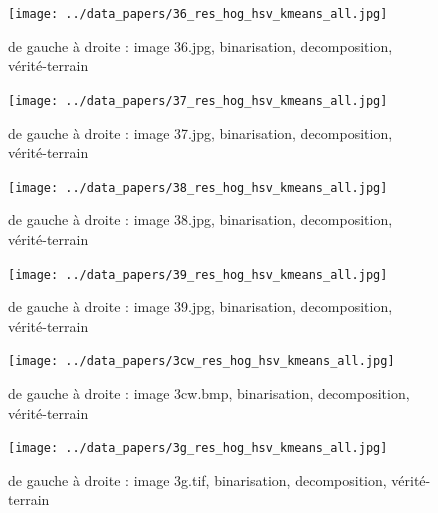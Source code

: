 \documentclass{book}
\begin{document}
\begin{figure}[H]
\begin{center}
\texttt{[image: ../data\_papers/36\_res\_hog\_hsv\_kmeans\_all.jpg]}
\end{center}
\caption{de gauche à droite : image 36.jpg, binarisation, decomposition, vérité-terrain}
\label{36}
\end{figure}
\clearpage


\begin{figure}[H]
\begin{center}
\texttt{[image: ../data\_papers/37\_res\_hog\_hsv\_kmeans\_all.jpg]}
\end{center}
\caption{de gauche à droite : image 37.jpg, binarisation, decomposition, vérité-terrain}
\label{37}
\end{figure}
\clearpage


\begin{figure}[H]
\begin{center}
\texttt{[image: ../data\_papers/38\_res\_hog\_hsv\_kmeans\_all.jpg]}
\end{center}
\caption{de gauche à droite : image 38.jpg, binarisation, decomposition, vérité-terrain}
\label{38}
\end{figure}
\clearpage


\begin{figure}[H]
\begin{center}
\texttt{[image: ../data\_papers/39\_res\_hog\_hsv\_kmeans\_all.jpg]}
\end{center}
\caption{de gauche à droite : image 39.jpg, binarisation, decomposition, vérité-terrain}
\label{39}
\end{figure}
\clearpage


\begin{figure}[H]
\begin{center}
\texttt{[image: ../data\_papers/3cw\_res\_hog\_hsv\_kmeans\_all.jpg]}
\end{center}
\caption{de gauche à droite : image 3cw.bmp, binarisation, decomposition, vérité-terrain}
\label{3cw}
\end{figure}
\clearpage


\begin{figure}[H]
\begin{center}
\texttt{[image: ../data\_papers/3g\_res\_hog\_hsv\_kmeans\_all.jpg]}
\end{center}
\caption{de gauche à droite : image 3g.tif, binarisation, decomposition, vérité-terrain}
\label{3g}
\end{figure}
\clearpage
\end{document}
